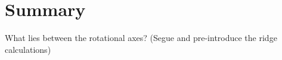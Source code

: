 \section{Summary}
\label{sec:borohydrides-summary}

\bit
\item What lies between the rotational axes? (Segue and pre-introduce the ridge calculations)
\eit

\placeholder
